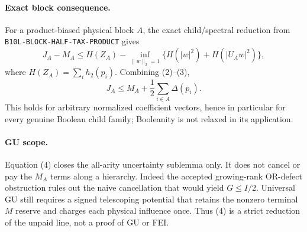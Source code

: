 \paragraph{Exact block consequence.}
For a product-biased physical block $A$, the exact child/spectral reduction
from \texttt{B10L-BLOCK-HALF-TAX-PRODUCT} gives
\[
 J_A-M_A\le H(Z_A)-
 \inf_{\|w\|_2=1}\{H(|w|^2)+H(|U_Aw|^2)\},                 \tag{3}
\]
where $H(Z_A)=\sum_i h_2(p_i)$.  Combining (2)--(3),
\[
 \boxed{J_A\le M_A+\frac12\sum_{i\in A}\Delta(p_i)}.      \tag{4}
\]
This holds for arbitrary normalized coefficient vectors, hence in
particular for every genuine Boolean child family; Booleanity is not
relaxed in its application.

\paragraph{GU scope.}
Equation (4) closes the all-arity uncertainty sublemma only.  It does not
cancel or pay the $M_A$ terms along a hierarchy.  Indeed the accepted
growing-rank OR-defect obstruction rules out the naive cancellation that
would yield $G\le I/2$.  Universal GU still requires a signed telescoping
potential that retains the nonzero terminal $M$ reserve and charges each
physical influence once.  Thus (4) is a strict reduction of the unpaid
line, not a proof of GU or FEI.

